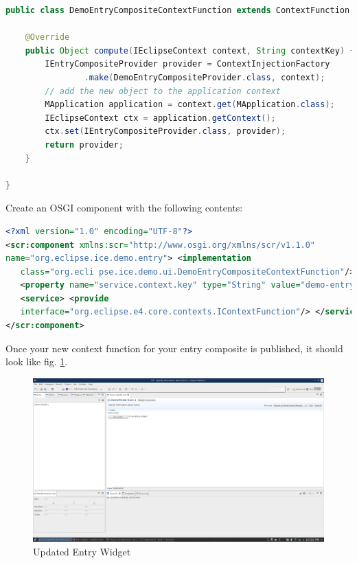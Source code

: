 \documentclass{article}
\begin{document}
\begin{lstlisting}[language=java]
public class DemoEntryCompositeContextFunction extends ContextFunction {

    @Override
    public Object compute(IEclipseContext context, String contextKey) {
        IEntryCompositeProvider provider = ContextInjectionFactory
                .make(DemoEntryCompositeProvider.class, context);
        // add the new object to the application context
        MApplication application = context.get(MApplication.class);
        IEclipseContext ctx = application.getContext();
        ctx.set(IEntryCompositeProvider.class, provider);
        return provider;
    }

}
\end{lstlisting}

Create an OSGI component with the following contents:

\begin{lstlisting}[language=xml]
<?xml version="1.0" encoding="UTF-8"?>
<scr:component xmlns:scr="http://www.osgi.org/xmlns/scr/v1.1.0"
name="org.eclipse.ice.demo.entry"> <implementation
   class="org.ecli pse.ice.demo.ui.DemoEntryCompositeContextFunction"/>
   <property name="service.context.key" type="String" value="demo-entry"/>
   <service> <provide
   interface="org.eclipse.e4.core.contexts.IContextFunction"/> </service>
</scr:component>
\end{lstlisting}

Once your new context function for your entry composite is published, it should
look like fig. \ref{fig:iceDemoEntryComposite}.

\begin{figure}[h]
\includegraphics[width=\textwidth]{pics/dynamicUI_demoEntryComposite.png}
\caption{Updated Entry Widget}
\label{fig:iceDemoEntryComposite}
\end{figure}
\end{document}
